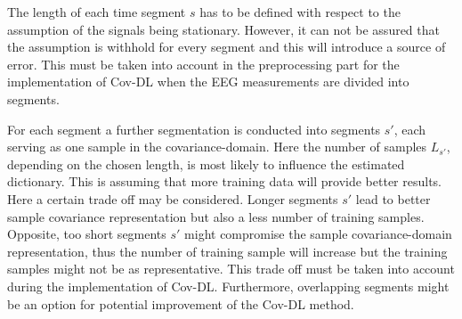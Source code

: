 The length of each time segment $s$ has to be defined with respect to the assumption of the signals being stationary. However, it can not be assured that the assumption is withhold for every segment and this will introduce a source of error. 
This must be taken into account in the preprocessing part for the implementation of Cov-DL when the EEG measurements are divided into segments.

For each segment a further segmentation is conducted into segments $s'$, each serving as one sample in the covariance-domain. Here the number of samples $L_{s'}$, depending on the chosen length, is most likely to influence the estimated dictionary. This is assuming that more training data will provide better results. Here a certain trade off may be considered. Longer segments $s'$ lead to better sample covariance representation but also a less number of training samples. Opposite, too short segments $s'$ might compromise the sample covariance-domain representation, thus the number of training sample will increase but the training samples might not be as representative. 
This trade off must be taken into account during the implementation of Cov-DL. 
Furthermore, overlapping segments might be an option for potential improvement of the Cov-DL method.